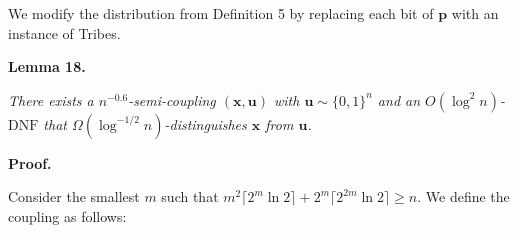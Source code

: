 We modify the distribution from Definition 5 by replacing each bit of $\mathbf{p}$ with an instance of Tribes.\par





\par\medskip\noindent\textbf{
\textbf{Lemma 18}\textbf{.}
}\par



\emph{There exists a $n^{-0.6}$-semi-coupling $(\bm{x},\bm{u})$ with $\bm{u}\sim\{0,1\}^{n}$ and an $O(\log^{2}n)$-$\mathrm{DNF}$ that $\Omega(\log^{-1/2}n)$-distinguishes $\bm{x}$ from $\bm{u}$.}\par






\par\medskip\noindent\textbf{Proof.}\par




Consider the smallest $m$ such that $m^{2}\lceil 2^{m}\ln 2\rceil+2^{m}\lceil 2^{2m}\ln 2\rceil\geq n$. We define the coupling as follows:\par


